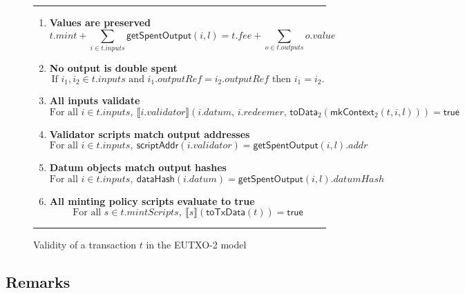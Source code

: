 \documentclass[a4paper]{article}
\newcommand{\s}{\textsf}  %
\newcommand{\msf}[1]{\ensuremath{\mathsf{#1}}}
\newcommand{\mi}[1]{\ensuremath{\mathit{#1}}}
\newcommand\rfskip{7pt}
\newenvironment{ruledfigure}[1]{\begin{figure}[#1]\hrule\vspace{\rfskip}}{\vspace{\rfskip}\hrule\end{figure}}
\newcommand{\true}{\textsf{true}}
\newcommand{\scriptAddr}{\msf{scriptAddr}}
\newcommand{\toData}{\ensuremath{\s{toData}}}
\newcommand{\toTxData}{\ensuremath{\s{toTxData}}}
\newcommand{\mkContext}{\ensuremath{\s{mkContext}}}
\newcommand{\hashData}{\msf{dataHash}}
\newcommand{\inputs}{\mi{inputs}}
\newcommand{\outputs}{\mi{outputs}}
\newcommand{\mint}{\mi{mint}}
\newcommand{\mintScripts}{\mi{mintScripts}}
\newcommand{\fee}{\mi{fee}}
\newcommand{\addr}{\mi{addr}}
\newcommand{\val}{\mi{value}}  %
\newcommand{\validator}{\mi{validator}}
\newcommand{\redeemer}{\mi{redeemer}}
\newcommand{\datum}{\mi{datum}}
\newcommand{\datumHash}{\mi{datumHash}}
\newcommand{\outputref}{\mi{outputRef}}
\newcommand{\getSpent}{\msf{getSpentOutput}}
\newcommand{\applyScript}[1]{\ensuremath{\llbracket#1\rrbracket}}
\newcommand{\applyMPScript}[1]{\ensuremath{\llbracket#1\rrbracket}}
\begin{document}
\begin{ruledfigure}{H}
\begin{enumerate}
\item
  \label{rule:value-is-preserved-2}
  \textbf{Values are preserved}
  \begin{displaymath}
    t.\mint + \sum_{i \in t.\inputs} \getSpent(i, l) = t.\fee + \sum_{o \in t.\outputs} o.\val
  \end{displaymath}

\item
  \label{rule:no-double-spending-2}
  \textbf{No output is double spent}
  \begin{displaymath}
    \textrm{If } i_1, i_2 \in t.\inputs \textrm{ and }  i_1.\outputref = i_2.\outputref
    \textrm{ then } i_1 = i_2.
  \end{displaymath}

\item
  \label{rule:all-inputs-validate-2}
  \textbf{All inputs validate}
  \begin{displaymath}
    \textrm{For all } i \in t.\inputs,\ \applyScript{i.\validator}(i.\datum,\, i.\redeemer,
    \, \toData_2(\mkContext_2(t, i, l))) = \true
  \end{displaymath}

\item
  \label{rule:validator-scripts-hash-2}
  \textbf{Validator scripts match output addresses}
  \begin{displaymath}
    \textrm{For all } i \in t.\inputs,\ \scriptAddr(i.\validator) = \getSpent(i, l).\addr
  \end{displaymath}

\item
  \label{rule:datum-objects-hash-2}
  \textbf{Datum objects match output hashes}
  \begin{displaymath}
    \textrm{For all } i \in t.\inputs,\ \hashData(i.\datum) = \getSpent(i, l).\datumHash
  \end{displaymath}

\item
  \label{rule:all-mpss-run}
  \textbf{All minting policy scripts evaluate to true}
  \begin{displaymath}
    \textrm{For all } s \in t.\mintScripts,\ \applyMPScript{s}(\toTxData(t)) = \true
  \end{displaymath}

\end{enumerate}
\caption{Validity of a transaction $t$ in the EUTXO-2 model}
\label{fig:eutxo-2-validity}
\end{ruledfigure}

\subsection{Remarks}
\end{document}
